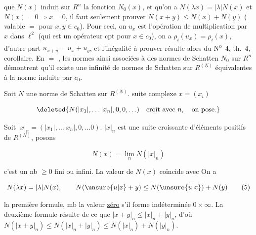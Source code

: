 
que $N(x)$ induit sur $R^n$ la fonction $N_0(x)$, et qu'on a $N(\lambda x)=|\lambda|N(x)$ et $N(x)=0\Rightarrow x=0$, il faut seulement prouver $N(x+y)\leq N(x)+N(y)$ ( valable $=$ pour $x,y\in c_0$). Pour ceci, on  $u_x$ est l'opération de multiplication par $x$ dans $\ell^2$ (qui est un opérateur cpt pour $x\in c_0$), on a  $\rho_i(u_x)=\rho_i(x)$, d'autre part  $u_{x+y}=u_x+u_y$, et l'inégalité à prouver résulte alors du N\textsuperscript{o}~4, th.~4, corollaire. En $=$ , les normes  ainsi associées à des normes  de Schatten $N_0$ sur $R^{n}$  démontrent qu'il existe une infinité  de normes de Schatten sur $R^{(\underline N)}$ équivalentes à la norme induite par $c_0$.

Soit $N$  une norme de Schatten sur  $R^{(\underline N)}$.  suite  complexe $x=(x_i)$ 

\[
\deleted{N(|x_1|,\ldots |x_n|,0,0,\ldots)\quad\text{croît avec }n,\quad\text{on pose.}}
\]

Soit $|x|_n=(|x_1|,\ldots |x_n|,0,\ldots 0)$.   $|x|_n$ est une suite croissante d'éléments positifs de $R^{(N)}$, posons

\[
N(x)=\lim_n N(|x|_n)\tag*{(4)}
\]

c'est un nb $\geq 0$ fini ou infini. La valeur  de $N(x)$ coïncide avec   On a

\[
N(\lambda x)=|\lambda|N(x),\qquad N(\unsure{u|x}+y)\leq N(\unsure{u|x})+N(y)\tag*{(5)}
\]

  la première formule,   mb la valeur \uline{zéro} s'il  forme indéterminée $0\times\infty$. La deuxième formule résulte de ce que  $|x+y|_n\leq |x|_n+|y|_n$, d'où $N(|x+y|_n)\leq N(|x|_n+|y|_n)\leq N(|x|_n)+N(|y|_n)$.

